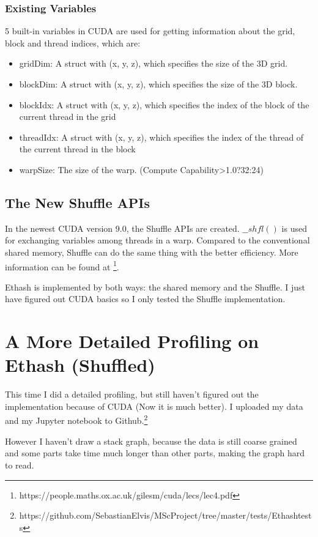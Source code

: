 \documentclass[11pt]{article}
\begin{document}
\subsubsection{Existing Variables}

5 built-in variables in CUDA are used for getting information about the grid, block and thread indices, which are:

\begin{itemize}
\item gridDim: A struct with (x, y, z), which specifies the size of the 3D grid.
\item blockDim: A struct with (x, y, z), which specifies the size of the 3D block.
\item blockIdx: A struct with (x, y, z), which specifies the index of the block of the current thread in the grid
\item threadIdx: A struct with (x, y, z), which specifies the index of the thread of the current thread in the block
\item warpSize: The size of the warp. (Compute Capability>1.0?32:24)
\end{itemize}

\subsection{The New Shuffle APIs}

In the newest CUDA version 9.0, the Shuffle APIs are created. $\_\_shfl()$ is used for exchanging variables among threads in a warp. Compared to the conventional shared memory, Shuffle can do the same thing with the better efficiency. More information can be found at \footnote{https://people.maths.ox.ac.uk/gilesm/cuda/lecs/lec4.pdf}.

Ethash is implemented by both ways: the shared memory and the Shuffle. I just have figured out CUDA basics so I only tested the Shuffle implementation.

\section{A More Detailed Profiling on Ethash (Shuffled)}

This time I did a detailed profiling, but still haven't figured out the implementation because of CUDA (Now it is much better). I uploaded my data and my Jupyter notebook to Github.\footnote{https://github.com/SebastianElvis/MScProject/tree/master/tests/Ethash\textunderscore tests}

However I haven't draw a stack graph, because the data is still coarse grained and some parts take time much longer than other parts, making the graph hard to read.
\end{document}
